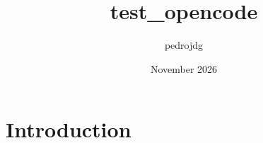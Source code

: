 \documentclass{article}
\title{test_opencode}
\author{pedrojdg }
\date{November 2026}
\begin{document}
\maketitle

\section{Introduction}
\end{document}
